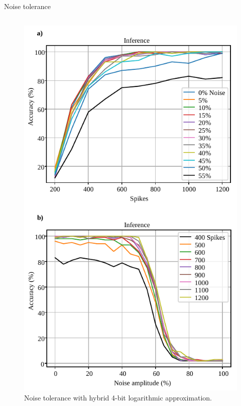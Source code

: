 \begin{frame}{Noise tolerance}
\begin{columns}
		\begin{column}{0.33\textwidth}
			\centering
			\begin{figure}
			\includegraphics[width=0.75\linewidth]{../chapters/sbs_accelerator/figures/accuracy_vs_noise_pu_log.pdf} %
			\caption{\scriptsize Noise tolerance with hybrid 4-bit logarithmic approximation.}
			\end{figure}
		\end{column}
	\end{columns}
\end{frame}

